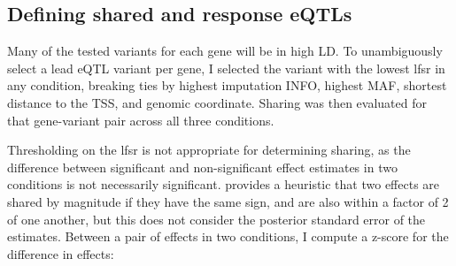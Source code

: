 \subsection{Defining shared and response eQTLs}

Many of the tested variants for each gene will be in high \gls{LD}.
To unambiguously select a lead \gls{eQTL} variant per gene, I selected the variant with the lowest lfsr in any condition, 
breaking ties by highest imputation INFO, highest \gls{MAF}, shortest distance to the \gls{TSS}, and genomic coordinate.
Sharing was then evaluated for that gene-variant pair across all three conditions.

Thresholding on the lfsr is not appropriate for determining sharing, as the difference between significant and non-significant effect estimates in two conditions is not necessarily significant\autocite{schenker2001JudgingSignificanceDifferences,gelman2006DifferenceSignificantNot}.
\autocite{urbut2018FlexibleStatisticalMethods} provides a heuristic that two effects are shared by magnitude if they have the same sign, and are also within a factor of 2 of one another,
but this does not consider the posterior standard error of the estimates.
Between a pair of effects in two conditions, I compute a z-score for the difference in effects\autocite{clogg1995StatisticalMethodsComparing,schenker2001JudgingSignificanceDifferences}:

